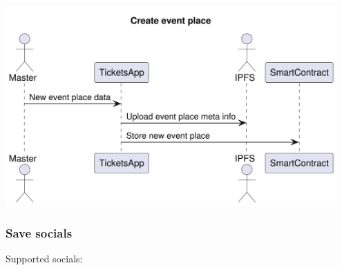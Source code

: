 \documentclass[11pt]{article}
\begin{document}
\begin{center}
\includegraphics[width=0.95\textwidth]{./img/create-event-place.png}
\label{orgf6bef35}
\end{center}
\subsubsection{Save socials}
\label{sec:orgf9e0efd}

Supported socials:
\end{document}
